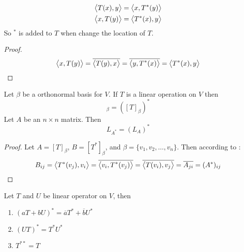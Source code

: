 \begin{theorem}
    \begin{equation}
        \begin{aligned}
            \left\langle \displaystyle T(x), y \right\rangle &= \left\langle \displaystyle x, T^*(y) \right\rangle \\
            \left\langle \displaystyle x, T(y) \right\rangle &= \left\langle \displaystyle T^*(x), y \right\rangle
        \end{aligned}        
    \end{equation}
    So $^*$ is added to $T$ when change the location of $T$.
\end{theorem}
\begin{proof}
    \begin{equation*}
        \left\langle \displaystyle x, T(y) \right\rangle = \overline{\left\langle \displaystyle T(y), x \right\rangle} = \overline{\left\langle \displaystyle y, T^*(x) \right\rangle} = \left\langle \displaystyle T^*(x), y \right\rangle
    \end{equation*}
\end{proof}

\begin{theorem}
    Let $\beta$ be a orthonormal basis for $V$. If $T$ is a linear operation on $V$ then
    \begin{equation}
        [T^*]_\beta = \left([T]_\beta \right)^*
    \end{equation}
    Let $A$ be an $n \times n$ matrix. Then
    \begin{equation}
        L_{A^*} = \left(L_A \right)^*
    \end{equation}
\end{theorem}
\begin{proof}
    Let $A=[T]_\beta$, $B=[T^*]_\beta$, and $\beta=\{v_1, v_2, \dots, v_n \}$. Then according to :
    \begin{equation*}
        B_{ij} = \left\langle \displaystyle T^*(v_j), v_i \right\rangle = \overline{\left\langle \displaystyle v_i, T^*(v_j) \right\rangle} = \overline{\left\langle \displaystyle T(v_i), v_j \right\rangle} = \overline{A_{ji}} = (A^*)_{ij}
    \end{equation*}
\end{proof}

\begin{theorem}
    Let $T$ and $U$ be linear operator on $V$, then
    \begin{enumerate}
        \item $(aT+bU)^* = \overline{a} T^* + \overline{b} U^*$
        \item $(UT)^* = T^* U^*$
        \item $T^{**} = T$
    \end{enumerate}    
\end{theorem}


